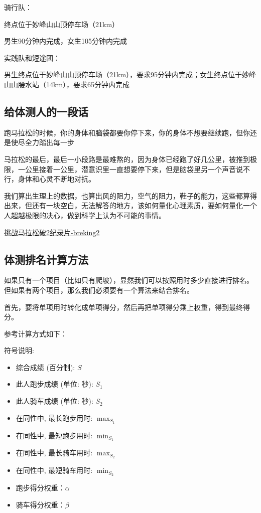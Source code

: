 \documentclass{ctexbook}
\begin{document}
骑行队：

终点位于妙峰山山顶停车场（21km）

男生90分钟内完成，女生105分钟内完成

实践队和短途团：

男生终点位于妙峰山山顶停车场（21km），要求95分钟内完成；女生终点位于妙峰山山腰水站（14km），要求65分钟内完成
\subsection{给体测人的一段话}
跑马拉松的时候，你的身体和脑袋都要你停下来，你的身体不想要继续跑，但你还是使尽全力踏出每一步

马拉松的最后，最后一小段路是最难熬的，因为身体已经跑了好几公里，被推到极限，一公里接着一公里，潜意识里一直想要停下来，但是脑袋里另一个声音说不行，身体和心灵不断地对抗。

我们算出生理上的数据，也算出风的阻力，空气的阻力，鞋子的能力，这些都算得出来，但还有一块空白，无法解答的地方，该如何量化心理素质，要如何量化一个人超越极限的决心，做到科学上认为不可能的事情。

\href{https://www.bilibili.com/video/BV1pb411K74L}{挑战马拉松破2纪录片-breking2}
\subsection{体测排名计算方法}
如果只有一个项目（比如只有爬坡），显然我们可以按照用时多少直接进行排名。但如果有两个项目，那么我们必须要有一个算法来结合排名。

首先，要将单项用时转化成单项得分，然后再把单项得分乘上权重，得到最终得分。

参考计算方式如下：

符号说明:

\begin{itemize}
    \item 综合成绩 (百分制):  $S$ 
    \item 此人跑步成绩 (单位: 秒):  $S_{1}$ 
    \item 此人骑车成绩 (单位: 秒):  $S_{2}$ 
    \item 在同性中, 最长跑步用时:  $\max _{S_{1}}$ 
    \item 在同性中, 最短跑步用时:  $\min _{S_{1}}$ 
    \item 在同性中, 最长骑车用时:  $\max _{S_{2}}$ 
    \item 在同性中, 最短骑车用时:  $\min _{S_{2}}$ 
    \item 跑步得分权重：$\alpha$
    \item 骑车得分权重：$\beta$
\end{itemize}
\end{document}
